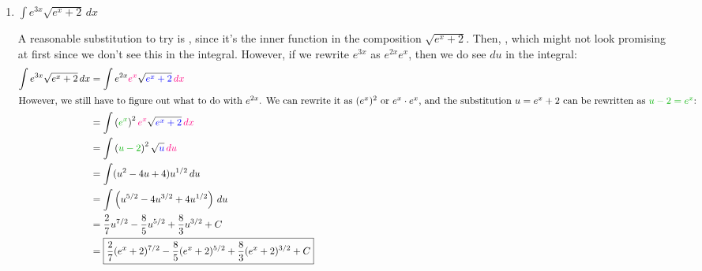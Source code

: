 \documentclass[main]{subfiles}
\begin{document}
\begin{enumerate}
\begin{enumerate}
    \begin{solution}
      A reasonable substitution to try is , since it's
      the inner function in the composition $\sqrt[3]{2y + 5}$.  With this
      substitution, $du = 2\,dy$, so .  We also
      see a $y$ by itself in the integral, but we can express this in
      terms of $u$: the equation $u = 2y + 5$ can be rewritten as
      : 
      \begin{align*}
        \int \sube{y} \sqrt[3]{\sub{2y + 5}}\,\subd{dy} &= \int
        \sube{\frac{u - 5}{2}} \sqrt[3]{\sub{u}} 
        \cdot \subd{\frac{1}{2}\,du} \\
        &= \frac{1}{4} \int (u - 5) \sqrt[3]{u}\,du \\
        &= \frac{1}{4} \int \left( u^{4/3} - 5 u^{1/3} \right) du \\
        &= \frac{1}{4} \left( \frac{3}{7} u^{7/3} - \frac{15}{4}
          u^{4/3} \right) + C \\
        &= \boxed{\frac{1}{4} \left( \frac{3}{7} (2y + 5)^{7/3} -
            \frac{15}{4} (2y + 5)^{4/3} \right) + C}
      \end{align*}
    \end{solution}

  \item
    \begin{problem}[\vfill]
      $\displaystyle \int e^{3x} \sqrt{e^x + 2}\,dx$
    \end{problem}

    \begin{solution}
      A reasonable substitution to try is , since it's
      the inner function in the composition $\sqrt{e^x + 2}$.  Then,
      , which might not look promising at first since
      we don't see this in the integral.  However, if we rewrite $e^{3x}$
      as $e^{2x} e^x$, then we do see $du$ in the integral:
      \begin{align*}
        \int e^{3x} \sqrt{e^x + 2}\,dx &= \int e^{2x} \subd{e^x}
        \sqrt{\sub{e^x + 2}}\,\subd{dx} \\
        \intertext{However, we still have to figure out what to do with
          $e^{2x}$.  We can rewrite it as $(e^x)^2$ or $e^x \cdot e^x$,
          and the substitution $u = e^x + 2$ can be rewritten as \sube{$u
            - 2 = e^x$}:} %
        &= \int \left( \sube{e^x} \right)^2 \subd{e^x}
        \sqrt{\sub{e^x + 2}}\,\subd{dx} \\
        &= \int \left( \sube{u - 2} \right)^2 \sqrt{\sub{u}}\, \subd{du} \\
        &= \int (u^2 - 4u + 4) u^{1/2}\,du \\
        &= \int \left( u^{5/2} - 4u^{3/2} + 4u^{1/2} \right)\,du \\
        &= \frac{2}{7} u^{7/2} - \frac{8}{5} u^{5/2} + \frac{8}{3}
        u^{3/2} + C \\
        &= \boxed{\frac{2}{7} (e^x + 2)^{7/2} - \frac{8}{5} (e^x +
          2)^{5/2} + \frac{8}{3} (e^x + 2)^{3/2} + C}
      \end{align*}
    \end{solution}


\end{enumerate}
\end{enumerate}
\end{document}
